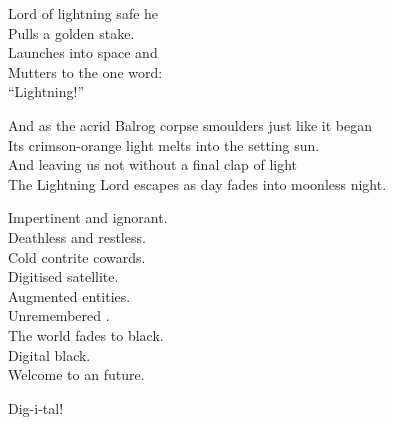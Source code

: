 Lord of lightning safe he \\
Pulls a golden stake. \\
Launches into space and \\
Mutters to the  one word: \\

``Lightning!'' \\





And as the acrid Balrog corpse smoulders just like it began \\
Its crimson-orange light melts into the setting sun. \\

And leaving us not without a final clap of light \\
The Lightning Lord escapes as day fades into moonless night. \\





Impertinent and ignorant. \\
Deathless and restless. \\
Cold contrite cowards. \\

Digitised satellite. \\
Augmented entities. \\
Unremembered . \\

The world fades to black. \\
Digital black. \\
Welcome to an  future. \\





Dig-i-tal! \\

